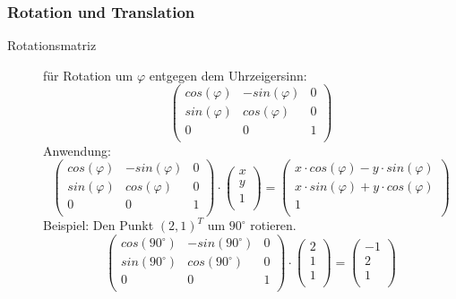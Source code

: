 \documentclass{article}
\begin{document}
\subsubsection{Rotation und Translation}
\begin{description}
 \item[Rotationsmatriz]
  für Rotation um $\varphi$ entgegen dem Uhrzeigersinn:
  \begin{equation}
   \left(\begin{array}{ccc}
    cos(\varphi) & -sin(\varphi) & 0 \\
    sin(\varphi) & cos(\varphi) & 0 \\
    0 & 0 & 1 \\
   \end{array}\right)
  \end{equation}
  Anwendung:
  \begin{equation}
   \left(\begin{array}{ccc}
    cos(\varphi) & -sin(\varphi) & 0 \\
    sin(\varphi) & cos(\varphi) & 0 \\
    0 & 0 & 1 \\
   \end{array}\right)
   \cdot
   \left(\begin{array}{ccc}
    x \\
    y \\
    1 \\
   \end{array}\right)
   =
   \left(\begin{array}{ccc}
    x \cdot cos(\varphi) - y \cdot sin(\varphi) \\
    x \cdot sin(\varphi) + y \cdot cos(\varphi) \\
    1 \\
   \end{array}\right)
  \end{equation}
  Beispiel: Den Punkt $(2, 1)^{T}$ um $90^{\circ}$ rotieren.
  \begin{equation}
   \left(\begin{array}{ccc}
    cos(90^{\circ}) & -sin(90^{\circ}) & 0 \\
    sin(90^{\circ}) & cos(90^{\circ}) & 0 \\
    0 & 0 & 1 \\
   \end{array}\right)
   \cdot
   \left(\begin{array}{ccc}
    2 \\
    1 \\
    1 \\
   \end{array}\right)
   =
   \left(\begin{array}{ccc}
    -1 \\
    2 \\
    1 \\
   \end{array}\right)
  \end{equation}


\end{description}
\end{document}
